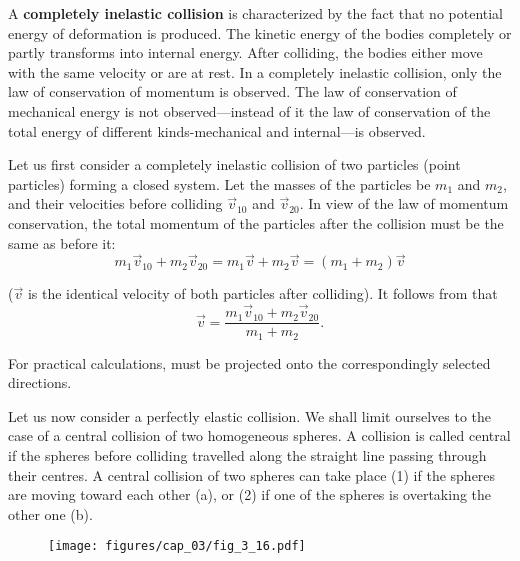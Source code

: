 A \textbf{completely inelastic collision} is characterized by the fact that no potential energy of deformation is produced. The kinetic energy of the bodies completely or partly transforms into internal energy. After colliding, the bodies either move with the same velocity or are at rest. In a completely inelastic collision, only the law of conservation of momentum is observed. The law of conservation of mechanical energy is not observed---instead of it the law of conservation of the total energy of different kinds-mechanical and internal---is observed.

Let us first consider a completely inelastic collision of two particles (point particles) forming a closed system. Let the masses of the particles be $m_1$ and $m_2$, and their velocities before colliding $\vec{v}_{10}$ and $\vec{v}_{20}$. In view of the law of momentum conservation, the total momentum of the particles after the collision must be the same as before it:
\begin{equation}\label{eq:3_93}
m_1\vec{v}_{10} + m_2\vec{v}_{20} = m_1\vec{v} + m_2\vec{v} = (m_1+m_2) \vec{v}
\end{equation}

\noindent
($\vec{v}$ is the identical velocity of both particles after colliding). It follows from  that
\begin{equation}\label{eq:3_94}
\vec{v} = \frac{m_1\vec{v}_{10} + m_2\vec{v}_{20}}{m_1+m_2}. 
\end{equation}

\noindent
For practical calculations,  must be projected onto the correspondingly selected directions.


Let us now consider a perfectly elastic collision. We shall limit ourselves to the case of a central collision of two homogeneous spheres. A collision is called central if the spheres before colliding travelled along the straight line passing through their centres. A central collision of two spheres can take place (1) if the spheres are moving toward each other (a), or (2) if one of the spheres is overtaking the other one (b).

\begin{figure}[t]
	\begin{center}
		\texttt{[image: figures/cap\_03/fig\_3\_16.pdf]}
		\caption[]{}
		\label{fig:3_16}
	\end{center}
	\vspace{-0.7cm}
\end{figure}

